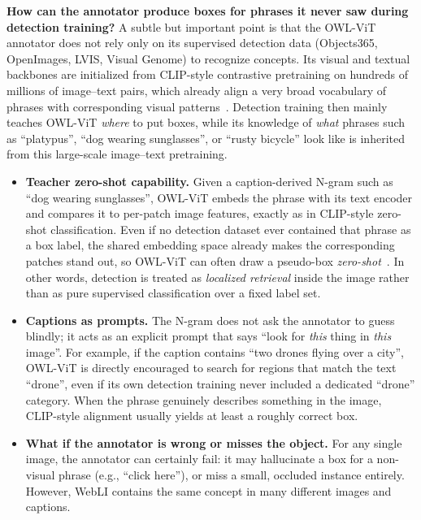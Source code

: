 \begin{enrichment}
\begin{enrichment}
\begin{enumerate}
			\medskip
			\noindent
			\textbf{How can the annotator produce boxes for phrases it never saw during detection training?}
			A subtle but important point is that the OWL-ViT annotator does not rely only on its supervised detection data (Objects365, OpenImages, LVIS, Visual Genome) to recognize concepts.
			Its visual and textual backbones are initialized from CLIP-style contrastive pretraining on hundreds of millions of image--text pairs, which already align a very broad vocabulary of phrases with corresponding visual patterns~\cite{minderer2022_owlvit}.
			Detection training then mainly teaches OWL-ViT \emph{where} to put boxes, while its knowledge of \emph{what} phrases such as ``platypus'', ``dog wearing sunglasses'', or ``rusty bicycle'' look like is inherited from this large-scale image--text pretraining.
			
			\begin{itemize}
				\item \textbf{Teacher zero-shot capability.}
				Given a caption-derived N-gram such as ``dog wearing sunglasses'', OWL-ViT embeds the phrase with its text encoder and compares it to per-patch image features, exactly as in CLIP-style zero-shot classification.
				Even if no detection dataset ever contained that phrase as a box label, the shared embedding space already makes the corresponding patches stand out, so OWL-ViT can often draw a pseudo-box \emph{zero-shot}~\cite{minderer2022_owlvit,minderer2024_owlvitv2}.
				In other words, detection is treated as \emph{localized retrieval} inside the image rather than as pure supervised classification over a fixed label set.
				
				\item \textbf{Captions as prompts.}
				The N-gram does not ask the annotator to guess blindly; it acts as an explicit prompt that says ``look for \emph{this} thing in \emph{this} image''.
				For example, if the caption contains ``two drones flying over a city'', OWL-ViT is directly encouraged to search for regions that match the text ``drone'', even if its own detection training never included a dedicated ``drone'' category.
				When the phrase genuinely describes something in the image, CLIP-style alignment usually yields at least a roughly correct box.
				
				\item \textbf{What if the annotator is wrong or misses the object.}
				For any single image, the annotator can certainly fail: it may hallucinate a box for a non-visual phrase (e.g., ``click here''), or miss a small, occluded instance entirely.
				However, WebLI contains the same concept in many different images and captions.
				

\end{itemize}
\end{enumerate}
\end{enrichment}
\end{enrichment}
